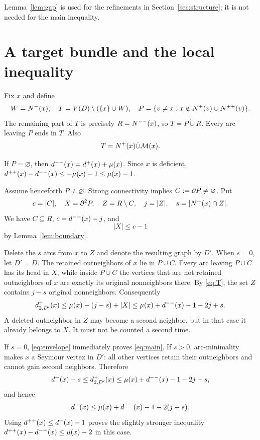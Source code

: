 Lemma~\ref{lem:gap} is used for the refinements in
Section~\ref{sec:structure}; it is not needed for the main inequality.

\section{A target bundle and the local inequality}

Fix $x$ and define
\[
W=N^-(x),\quad T=V(D)\setminus(\{x\}\cup W),\quad
P=\{v\ne x:x\notin N^+(v)\cup N^{++}(v)\}.
\]
The remaining part of $T$ is precisely $R=N^{--}(x)$, so
$T=P\dot\cup R$. Every arc leaving $P$ ends in $T$.
Also
\begin{equation}\label{eq:T}
T=N^+(x)\dot\cup\mathcal M(x).
\end{equation}

If $P=\varnothing$, then $d^{--}(x)=d^+(x)+\mu(x)$.
Since $x$ is deficient,
$d^{++}(x)-d^{--}(x)\le-\mu(x)-1\le\mu(x)-1$.

Assume henceforth $P\ne\varnothing$. Strong connectivity implies
$C:=\partial P\ne\varnothing$. Put
\[
c=|C|,\quad X=\partial^2P,\quad Z=R\setminus C,\quad
j=|Z|,\quad s=|N^+(x)\cap Z|.
\]
We have $C\subseteq R$, $c=d^{--}(x)-j$, and
\begin{equation}\label{eq:X}
|X|\le c-1
\end{equation}
by Lemma~\ref{lem:boundary}.

Delete the $s$ arcs from $x$ to $Z$ and denote the resulting graph by
$D'$. When $s=0$, let $D'=D$.
The retained outneighbors of $x$ lie in $P\cup C$.
Every arc leaving $P\cup C$ has its head in $X$, while inside $P\cup C$
the vertices that are not retained outneighbors of $x$ are exactly its
original nonneighbors there. By \eqref{eq:T}, the set $Z$ contains
$j-s$ original nonneighbors. Consequently
\begin{equation}\label{eq:envelope}
d_{2,D'}^+(x)\le\mu(x)-(j-s)+|X|
 \le \mu(x)+d^{--}(x)-1-2j+s.
\end{equation}
A deleted outneighbor in $Z$ may become a second neighbor, but in that
case it already belongs to $X$. It must not be counted a second time.

If $s=0$, \eqref{eq:envelope} immediately proves \eqref{eq:main}.
If $s>0$, arc-minimality makes $x$ a Seymour vertex in $D'$:
all other vertices retain their outneighbors and cannot gain second
neighbors. Therefore
\[
d^+(x)-s\le d_{2,D'}^+(x)
 \le\mu(x)+d^{--}(x)-1-2j+s,
\]
and hence
\[
d^+(x)\le\mu(x)+d^{--}(x)-1-2(j-s).
\]
Using $d^{++}(x)\le d^+(x)-1$ proves the slightly stronger inequality
$d^{++}(x)-d^{--}(x)\le\mu(x)-2$ in this case.

